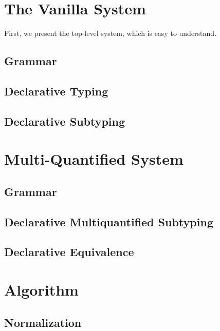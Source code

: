 \documentclass[a4,natbib=false]{article}
\begin{document}
\section{The Vanilla System}



First, we present the top-level system, which is easy to understand.

\subsection{Grammar}
\ottgrammartabular{
  \ottP\ottinterrule
  \ottN\ottinterrule
  \ottv\ottinterrule
  \ottc\ottinterrule
}

\subsection{Declarative Typing}

\subsection{Declarative Subtyping}
\ottdefnsDZero

\section{Multi-Quantified System}
\subsection{Grammar}
\ottgrammartabular{
  \ottiP\ottinterrule
  \ottiN\ottinterrule
}
\subsection{Declarative Multiquantified Subtyping}
\ottdefnsDOne

\subsection{Declarative Equivalence}
\ottdefnsEOne



\section{Algorithm}

\subsection{Normalization}
\end{document}
